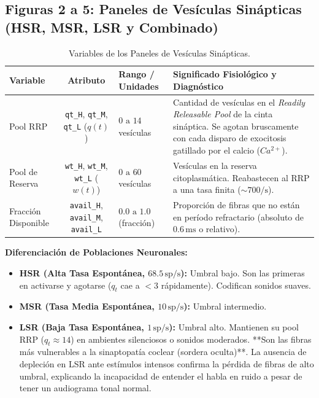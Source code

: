 \documentclass[12pt,a4paper]{article}
\begin{document}
\subsection{Figuras 2 a 5: Paneles de Vesículas Sinápticas (HSR, MSR, LSR y Combinado)}

\begin{table}[H]
\centering
\caption{Variables de los Paneles de Vesículas Sinápticas.}
\begin{tabular}{l c l p{6cm}}
\toprule
\textbf{Variable} & \textbf{Atributo} & \textbf{Rango / Unidades} & \textbf{Significado Fisiológico y Diagnóstico} \\
\midrule
Pool RRP & \texttt{qt\_H}, \texttt{qt\_M}, \texttt{qt\_L} ($q(t)$) & $0 \text{ a } 14$ vesículas & Cantidad de vesículas en el \emph{Readily Releasable Pool} de la cinta sináptica. Se agotan bruscamente con cada disparo de exocitosis gatillado por el calcio ($Ca^{2+}$). \\
Pool de Reserva & \texttt{wt\_H}, \texttt{wt\_M}, \texttt{wt\_L} ($w(t)$) & $0 \text{ a } 60$ vesículas & Vesículas en la reserva citoplasmática. Reabastecen al RRP a una tasa finita ($\sim 700/\text{s}$). \\
Fracción Disponible & \texttt{avail\_H}, \texttt{avail\_M}, \texttt{avail\_L} & $0.0 \text{ a } 1.0$ (fracción) & Proporción de fibras que no están en período refractario (absoluto de $0.6\,\text{ms}$ o relativo). \\
\bottomrule
\end{tabular}
\end{table}

\textbf{Diferenciación de Poblaciones Neuronales:}
\begin{itemize}
    \item \textbf{HSR (Alta Tasa Espontánea, $68.5\,\text{sp/s}$):} Umbral bajo. Son las primeras en activarse y agotarse ($q_t$ cae a $<3$ rápidamente). Codifican sonidos suaves.
    \item \textbf{MSR (Tasa Media Espontánea, $10\,\text{sp/s}$):} Umbral intermedio.
    \item \textbf{LSR (Baja Tasa Espontánea, $1\,\text{sp/s}$):} Umbral alto. Mantienen su pool RRP ($q_t \approx 14$) en ambientes silenciosos o sonidos moderados. **Son las fibras más vulnerables a la sinaptopatía coclear (sordera oculta)**. La ausencia de depleción en LSR ante estímulos intensos confirma la pérdida de fibras de alto umbral, explicando la incapacidad de entender el habla en ruido a pesar de tener un audiograma tonal normal.
\end{itemize}
\end{document}
